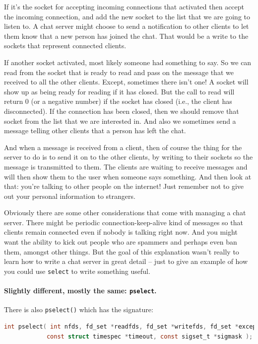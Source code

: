 \documentclass[a4paper]{report}
\begin{document}
If it's the socket for accepting incoming connections that activated then accept the incoming connection, and add the new socket to the list that we are going to listen to. A chat server might choose to send a notification to other clients to let them know that a new person has joined the chat. That would be a write to the sockets that represent connected clients.

If another socket activated, most likely someone had something to say. So we can read from the socket that is ready to read and pass on the message that we received to all the other clients. Except, sometimes there isn't one! A socket will show up as being ready for reading if it has closed. But the call to read will return 0 (or a negative number) if the socket has closed (i.e., the client has disconnected). If the connection has been closed, then we should remove that socket from the list that we are interested in. And also we sometimes send a message telling other clients that a person has left the chat.

And when a message is received from a client, then of course the thing for the server to do is to send it on to the other clients, by writing to their sockets so the message is transmitted to them. The clients are waiting to receive messages and will then show them to the user when someone says something. And then look at that: you're talking to other people on the internet! Just remember not to give out your personal information to strangers.

Obviously there are some other considerations that come with managing a chat server. There might be periodic connection-keep-alive kind of messages so that clients remain connected even if nobody is talking right now. And you might want the ability to kick out people who are spammers and perhaps even ban them, amongst other things. But the goal of this explanation wasn't really to learn how to write a chat server in great detail -- just to give an example of how you could use \texttt{select} to write something useful.

\paragraph{Slightly different, mostly the same: \texttt{pselect}.}
There is also \texttt{pselect()} which has the signature:
\begin{lstlisting}[language=C]
int pselect( int nfds, fd_set *readfds, fd_set *writefds, fd_set *exceptfds, 
            const struct timespec *timeout, const sigset_t *sigmask );
\end{lstlisting}
\end{document}
